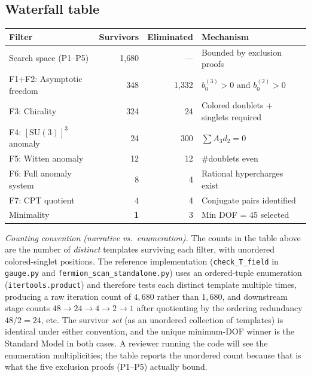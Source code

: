 \documentclass[11pt,a4paper]{article}
\theoremstyle{definition}
\newcommand{\SU}{\mathrm{SU}}
\begin{document}
\subsection{Waterfall table}
\label{sec:waterfall}

\begin{center}
\small
\begin{tabular}{@{}lrrl@{}}
\toprule
\textbf{Filter} & \textbf{Survivors} & \textbf{Eliminated} & \textbf{Mechanism} \\
\midrule
Search space (P1--P5) & 1{,}680 & --- & Bounded by exclusion proofs \\
F1+F2: Asymptotic freedom & 348 & 1{,}332 & $b_0^{(3)} > 0$ and $b_0^{(2)} > 0$ \\
F3: Chirality & 324 & 24 & Colored doublets + singlets required \\
F4: $[\SU(3)]^3$ anomaly & 24 & 300 & $\sum A_3 d_2 = 0$ \\
F5: Witten anomaly & 12 & 12 & $\#$doublets even \\
F6: Full anomaly system & 8 & 4 & Rational hypercharges exist \\
F7: CPT quotient & 4 & 4 & Conjugate pairs identified \\
Minimality & \textbf{1} & 3 & Min DOF = 45 selected \\
\bottomrule
\end{tabular}
\end{center}

\smallskip\noindent\textit{Counting convention (narrative vs.\ enumeration).}\quad
The counts in the table above are the number of \emph{distinct}
templates surviving each filter, with unordered colored-singlet positions.
The reference implementation (\texttt{check\_T\_field} in
\texttt{gauge.py} and \texttt{fermion\_scan\_standalone.py}) uses an
ordered-tuple enumeration (\texttt{itertools.product}) and therefore
tests each distinct template multiple times, producing a raw iteration
count of $4{,}680$ rather than $1{,}680$, and downstream stage counts
$48 \to 24 \to 4 \to 2 \to 1$ after quotienting by the ordering
redundancy $48/2 = 24$, etc.  The survivor \emph{set} (as an unordered
collection of templates) is identical under either convention, and the
unique minimum-DOF winner is the Standard Model in both cases.
A reviewer running the code will see the enumeration multiplicities;
the table reports the unordered count because that is what the
five exclusion proofs (P1--P5) actually bound.
\end{document}
